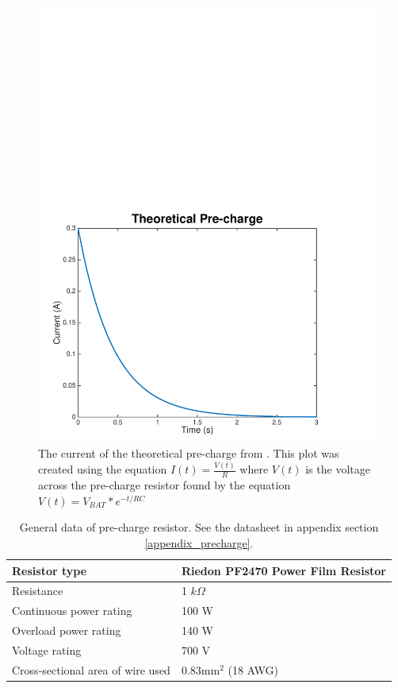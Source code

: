 \documentclass{article}
\begin{document}
\begin{figure}[H]
    \centering
    \includegraphics[width = 0.8 \textwidth]{precharge_current}
    \caption{The current of the theoretical pre-charge from . This plot was created using the equation $I(t) = \frac{V(t)}{R}$ where $V(t)$ is the voltage across the pre-charge resistor found by the equation $V(t) = V_{BAT} * e^{-t/RC}$ }
    \label{fig:precharge_current}
\end{figure}

    \begin{table}[H]
	    \centering
	    \begin{tabular}{|l|l|}
	    \hline
	    Resistor type & Riedon PF2470 Power Film Resistor \\ \hline
	    Resistance & 1 $k\Omega$ \\ \hline
	    Continuous power rating & 100 W \\ \hline
	    Overload power rating & 140 W \\ \hline
	    Voltage rating & 700 V \\ \hline
	    Cross-sectional area of wire used & 0.83mm$^2$ (18 AWG)\\ \hline
	    \end{tabular}
	    \caption{General data of pre-charge resistor. See the datasheet in appendix section \ref{appendix_precharge}.}
	    \label{prechargeresistor}
	\end{table}
\end{document}
